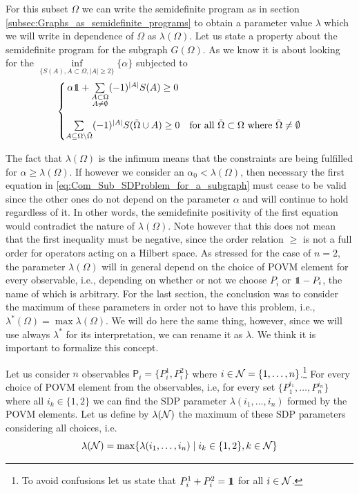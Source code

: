 \documentclass[10pt, a4paper]{amsart}
\begin{document}
For this subset $\Omega $ we can write the semidefinite program as in section \ref{subsec:Graphs_as_semidefinite_programs} to obtain a parameter value $\lambda$ which we will write in dependence of $\Omega $ as $\lambda (\Omega)$. Let us state a property about the semidefinite program for the subgraph $G(\Omega)$. As we know it is about looking for the $\inf\limits_{\{S(A), A\subset\Omega, |A|\geq 2\}} \{\alpha\}$ subjected to 
\begin{equation}\label{eq:Com_Sub_SDProblem_for_a_subgraph}
\left\{
\begin{matrix}
\alpha \bbone + \sum\limits_{\substack{A\subset \Omega\\ A\neq \emptyset}}(-1)^{|A|}S(A)\geq 0\\
\\
\sum\limits_{A\subseteq \Omega \backslash \tilde{\Omega}} (-1)^{|A|}S(\tilde{\Omega}\cup A) \geq 0
&
\mbox{for all } \tilde{\Omega} \subset \Omega \mbox{ where } \tilde{\Omega} \neq \emptyset
\end{matrix}
\right.
\end{equation}

The fact that $\lambda(\Omega) $ is the infimum means that the constraints are being fulfilled for $\alpha \geq \lambda(\Omega)$. If however we 
consider an $\alpha_{0}<\lambda (\Omega)$, then necessary the first equation in \ref{eq:Com_Sub_SDProblem_for_a_subgraph} must cease to be valid since the other ones do not depend on the parameter $\alpha$ and will continue to hold regardless of it. In other words, the semidefinite positivity of the first equation  would contradict the nature of $\lambda (\Omega)$. Note however that this does not mean that the first inequality must be negative, since the order relation $\geq $ is not a full order for operators acting on a Hilbert space. 
As stressed for the case of $n=2$, the parameter $\lambda( \Omega)$ will in general depend on the choice of POVM element for every observable, i.e., depending on whether or not we choose $P_{i}$ or $\bbone - P_{i}$, the name of which is arbitrary. For the last section, the conclusion was to consider the maximum of these parameters in order not to have this problem, i.e., $\lambda^{*} (\Omega ) = \max{\lambda(\Omega)}$. We will do here the same thing, however, since we will use always $\lambda^{*}$ for its interpretation, we can rename it as $\lambda$. We think it is important to formalize this concept.

\begin{definition}\label{definition:lambda(N)}
Let us consider $n$ observables $\mathsf{P}_{i} = \{P^{1}_{i},  P^{2}_{i}\}$ where  $i\in\mathcal{N} = \{1, \ldots , n\}$.\footnote{To avoid confusions let us state that $P_{i}^{1} + P_{i}^{2} = \bbone$ for all $i\in \mathcal{N}$. }
For every choice of POVM element from the observables, i.e, for every set $\{P_{1}^{i_{1}}, \ldots , P_{n}^{i_{n}} \}$ where all $i_{k}\in \{1,2\}$ we can find the SDP parameter $\lambda (i_{1}, \ldots , i_{n}) $ formed by the POVM elements. Let us define by $\lambda ( \mathcal{N})$ the maximum of these SDP parameters considering all choices, i.e. 
$$
\lambda ( \mathcal{N}) = \max\{\lambda (i_{1}, \ldots , i_{n}) \mid i_{k}\in \{1,2\}, k \in\mathcal{N} \}
$$ 
\end{definition}
\end{document}

